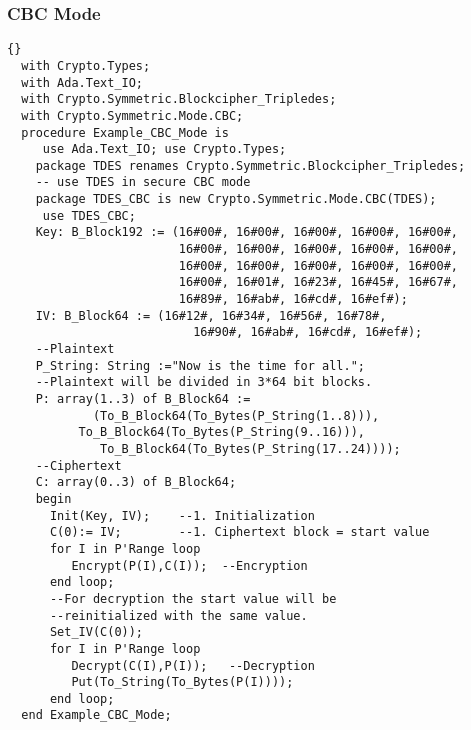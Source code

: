 \subsubsection*{CBC Mode}
\begin{lstlisting}{}
  with Crypto.Types;
  with Ada.Text_IO;
  with Crypto.Symmetric.Blockcipher_Tripledes;
  with Crypto.Symmetric.Mode.CBC;
  procedure Example_CBC_Mode is
	 use Ada.Text_IO; use Crypto.Types;
    package TDES renames Crypto.Symmetric.Blockcipher_Tripledes;
    -- use TDES in secure CBC mode
    package TDES_CBC is new Crypto.Symmetric.Mode.CBC(TDES);
	 use TDES_CBC;
    Key: B_Block192 := (16#00#, 16#00#, 16#00#, 16#00#, 16#00#, 
                        16#00#, 16#00#, 16#00#, 16#00#, 16#00#, 
                        16#00#, 16#00#, 16#00#, 16#00#, 16#00#, 
                        16#00#, 16#01#, 16#23#, 16#45#, 16#67#, 
                        16#89#, 16#ab#, 16#cd#, 16#ef#);
    IV: B_Block64 := (16#12#, 16#34#, 16#56#, 16#78#,
            	          16#90#, 16#ab#, 16#cd#, 16#ef#);
    --Plaintext
    P_String: String :="Now is the time for all.";
    --Plaintext will be divided in 3*64 bit blocks.
    P: array(1..3) of B_Block64 := 
			(To_B_Block64(To_Bytes(P_String(1..8))),
          To_B_Block64(To_Bytes(P_String(9..16))),
			 To_B_Block64(To_Bytes(P_String(17..24))));
    --Ciphertext
    C: array(0..3) of B_Block64;
    begin
      Init(Key, IV);    --1. Initialization
      C(0):= IV;        --1. Ciphertext block = start value
      for I in P'Range loop
	     Encrypt(P(I),C(I));  --Encryption
      end loop;
      --For decryption the start value will be 
      --reinitialized with the same value.
      Set_IV(C(0));         
      for I in P'Range loop
         Decrypt(C(I),P(I));   --Decryption
         Put(To_String(To_Bytes(P(I))));
      end loop;
  end Example_CBC_Mode;
\end{lstlisting}\\ \ \\
